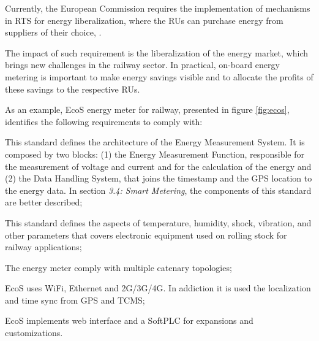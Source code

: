 	Currently, the European Commission requires the implementation of mechanisms in \ac{RTS} for energy liberalization, where the \ac{RUs} can purchase energy from suppliers of their choice, \cite{eur-lex2008}.
	
	The impact of such requirement is the liberalization of the energy market, which brings new challenges in the railway sector. In practical, on-board energy metering is important to make energy savings visible and to allocate the profits of these savings to the respective RUs.
	
	As an example, EcoS energy meter for railway, presented in figure \ref{fig:ecos}, identifies the following requirements to comply with:
	
	\begin{description}
	\setlength\itemsep{-0em}
	
	\item [EN 50463 standard \cite{EN50463}] This standard defines the architecture of the Energy Measurement System. It is composed by two blocks: (1) the Energy Measurement Function, responsible for the measurement of voltage and current and for the calculation of the energy and (2) the Data Handling System, that joins the timestamp and the GPS location to the energy data. In section \textit{3.4: Smart Metering}, the components of this standard are better described;
	
	\item [EN 50155 standard \cite{EN50155}] This standard defines the aspects of temperature, humidity, shock, vibration, and other parameters that covers electronic equipment used on rolling stock for railway applications;
	
	\item [\ac{AC} and \ac{DC} measurement channels] The energy meter comply with multiple catenary topologies;
	
	\item [Multiple Connectivity] EcoS uses WiFi, Ethernet and 2G/3G/4G. In addiction it is used the localization and time sync from \ac{GPS} and \ac{TCMS};
	
	\item [Multiple access and customization] EcoS implements web interface and a SoftPLC for expansions and customizations.
	\end{description}



